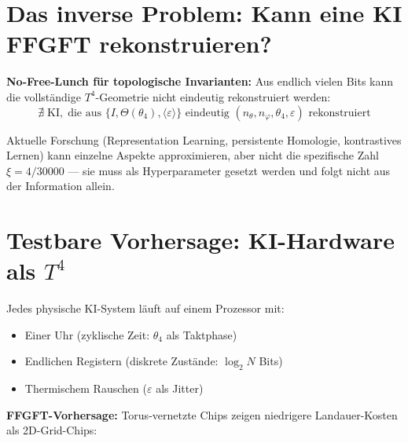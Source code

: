 \section{Das inverse Problem: Kann eine KI FFGFT rekonstruieren?}

\textbf{No-Free-Lunch für topologische Invarianten:} Aus endlich vielen
Bits kann die vollständige $T^4$-Geometrie nicht eindeutig rekonstruiert werden:
\begin{equation}
  \nexists\;\text{KI},\;\text{die aus }
  \{I,\Theta(\theta_4),\langle\varepsilon\rangle\}
  \text{ eindeutig }
  (n_\theta,n_\varphi,\theta_4,\varepsilon) \text{ rekonstruiert}
  \tag{243.14}
\end{equation}

Aktuelle Forschung (Representation Learning, persistente Homologie,
kontrastives Lernen) kann einzelne Aspekte approximieren, aber nicht
die spezifische Zahl $\xi = 4/30000$ --- sie muss als Hyperparameter
gesetzt werden und folgt nicht aus der Information allein.

\section{Testbare Vorhersage: KI-Hardware als $T^4$}

Jedes physische KI-System läuft auf einem Prozessor mit:
\begin{itemize}
  \item Einer Uhr (zyklische Zeit: $\theta_4$ als Taktphase)
  \item Endlichen Registern (diskrete Zustände: $\log_2 N$ Bits)
  \item Thermischem Rauschen ($\varepsilon$ als Jitter)
\end{itemize}

\textbf{FFGFT-Vorhersage:} Torus-vernetzte Chips zeigen niedrigere
Landauer-Kosten als 2D-Grid-Chips:

\begin{center}
\renewcommand{\arraystretch}{1.3}
{\small
{}
}
\end{center}

